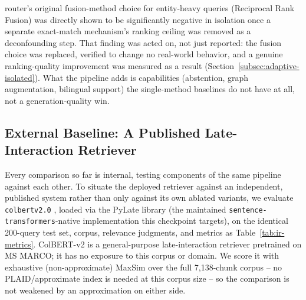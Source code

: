 \documentclass[a4paper,twoside]{article}
\begin{document}
router's original fusion-method choice for entity-heavy queries (Reciprocal Rank Fusion) was directly shown to be significantly negative in isolation once a separate exact-match mechanism's ranking ceiling was removed as a deconfounding step. That finding was acted on, not just reported: the fusion choice was replaced, verified to change no real-world behavior, and a genuine ranking-quality improvement was measured as a result (Section~\ref{subsec:adaptive-isolated}). What the pipeline adds is capabilities (abstention, graph augmentation, bilingual support) the single-method baselines do not have at all, not a generation-quality win.

\subsection{External Baseline: A Published Late-Interaction Retriever}
\label{subsec:colbert-baseline}

Every comparison so far is internal, testing components of the same pipeline against each other. To situate the deployed retriever against an independent, published system rather than only against its own ablated variants, we evaluate \texttt{colbertv2.0} \citep{santhanam2022colbertv2}, loaded via the PyLate library \citep{pylate2025} (the maintained \texttt{sentence-transformers}-native implementation this checkpoint targets), on the identical 200-query test set, corpus, relevance judgments, and metrics as Table~\ref{tab:ir-metrics}. ColBERT-v2 is a general-purpose late-interaction retriever pretrained on MS MARCO; it has no exposure to this corpus or domain. We score it with exhaustive (non-approximate) MaxSim over the full 7{,}138-chunk corpus -- no PLAID/approximate index is needed at this corpus size -- so the comparison is not weakened by an approximation on either side.
\end{document}
